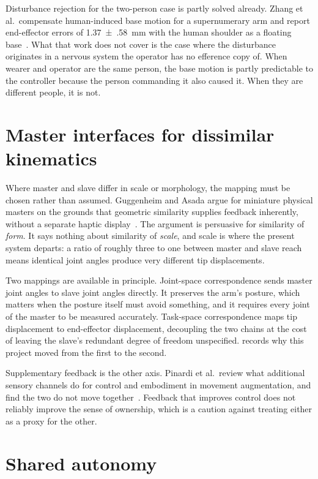 Disturbance rejection for the two-person case is partly solved already. Zhang
et al.\ compensate human-induced base motion for a supernumerary arm and
report end-effector errors of \SI{1.37(58)}{\milli\metre} with the human
shoulder as a floating base~\cite{zhang2024motioncomp}. What that work does
not cover is the case where the disturbance originates in a nervous system the
operator has no efference copy of. When wearer and operator are the same
person, the base motion is partly predictable to the controller because the
person commanding it also caused it. When they are different people, it is not.

\section{Master interfaces for dissimilar kinematics}

Where master and slave differ in scale or morphology, the mapping must be
chosen rather than assumed. Guggenheim and Asada argue for miniature physical
masters on the grounds that geometric similarity supplies feedback
inherently, without a separate haptic display~\cite{guggenheim2021haptic}.
The argument is persuasive for similarity of \emph{form}. It says nothing
about similarity of \emph{scale}, and scale is where the present system
departs: a ratio of roughly three to one between master and slave reach means
identical joint angles produce very different tip displacements.

Two mappings are available in principle. Joint-space correspondence sends
master joint angles to slave joint angles directly. It preserves the arm's
posture, which matters when the posture itself must avoid something, and it
requires every joint of the master to be measured accurately. Task-space
correspondence maps tip displacement to end-effector displacement, decoupling
the two chains at the cost of leaving the slave's redundant degree of freedom
unspecified.  records why this project moved from the
first to the second.

Supplementary feedback is the other axis. Pinardi et al.\ review what
additional sensory channels do for control and embodiment in movement
augmentation, and find the two do not move
together~\cite{pinardi2023feedback}. Feedback that improves control does not
reliably improve the sense of ownership, which is a caution against treating
either as a proxy for the other.

\section{Shared autonomy}

